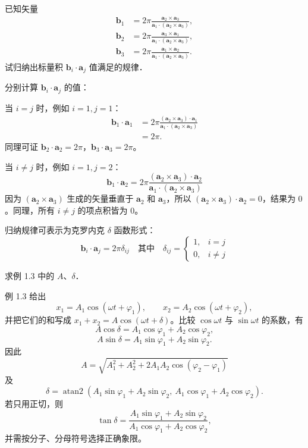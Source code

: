 \begin{exercise}\label{ex:1.17}
已知矢量
\[
\begin{aligned}
\boldsymbol b_1&=2\pi\frac{\boldsymbol a_2\times\boldsymbol a_3}{\boldsymbol a_1\cdot(\boldsymbol a_2\times\boldsymbol a_3)},\\
\boldsymbol b_2&=2\pi\frac{\boldsymbol a_3\times\boldsymbol a_1}{\boldsymbol a_1\cdot(\boldsymbol a_2\times\boldsymbol a_3)},\\
\boldsymbol b_3&=2\pi\frac{\boldsymbol a_1\times\boldsymbol a_2}{\boldsymbol a_1\cdot(\boldsymbol a_2\times\boldsymbol a_3)}.
\end{aligned}
\]
试归纳出标量积 $\boldsymbol{b}_i \cdot \boldsymbol{a}_j$ 值满足的规律．
\end{exercise}
\begin{solution}
分别计算 $\boldsymbol{b}_i \cdot \boldsymbol{a}_j$ 的值：

当 $i = j$ 时，例如 $i=1, j=1$：
\[
\begin{aligned}
\boldsymbol b_1\cdot\boldsymbol a_1
 &=2\pi\frac{(\boldsymbol a_2\times\boldsymbol a_3)\cdot\boldsymbol a_1}
 {\boldsymbol a_1\cdot(\boldsymbol a_2\times\boldsymbol a_3)}\\
 &=2\pi.
\end{aligned}
\]
同理可证 $\boldsymbol{b}_2 \cdot \boldsymbol{a}_2 = 2\pi$，$\boldsymbol{b}_3 \cdot \boldsymbol{a}_3 = 2\pi$。

当 $i \neq j$ 时，例如 $i=1, j=2$：
$$ \boldsymbol{b}_1 \cdot \boldsymbol{a}_2 = 2\pi \frac{(\boldsymbol{a}_2 \times \boldsymbol{a}_3) \cdot \boldsymbol{a}_2}{\boldsymbol{a}_1 \cdot (\boldsymbol{a}_2 \times \boldsymbol{a}_3)} $$
因为 $(\boldsymbol{a}_2 \times \boldsymbol{a}_3)$ 生成的矢量垂直于 $\boldsymbol{a}_2$ 和 $\boldsymbol{a}_3$，所以 $(\boldsymbol{a}_2 \times \boldsymbol{a}_3) \cdot \boldsymbol{a}_2 = 0$，结果为 $0$。同理，所有 $i \neq j$ 的项点积皆为 $0$。

归纳规律可表示为克罗内克 $\delta$ 函数形式：
$$ \boldsymbol{b}_i \cdot \boldsymbol{a}_j = 2\pi \delta_{ij} \quad \text{其中} \quad \delta_{ij} = \begin{cases} 1, & i = j \\ 0, & i \neq j \end{cases} $$
\end{solution}

\begin{exercise}\label{ex:1.18}
求例 1.3 中的 $A$、$\delta$．
\end{exercise}
\begin{solution}
例 1.3 给出
$$
x_1=A_1\cos(\omega t+\varphi_1),\qquad x_2=A_2\cos(\omega t+\varphi_2),
$$
并把它们的和写成 $x_1+x_2=A\cos(\omega t+\delta)$。比较 $\cos\omega t$ 与 $\sin\omega t$ 的系数，有
$$
A\cos\delta=A_1\cos\varphi_1+A_2\cos\varphi_2,
$$
$$
A\sin\delta=A_1\sin\varphi_1+A_2\sin\varphi_2.
$$
因此
$$
\boxed{A=\sqrt{A_1^2+A_2^2+2A_1A_2\cos(\varphi_2-\varphi_1)}}
$$
及
$$
\boxed{\delta=\operatorname{atan2}\!\left(A_1\sin\varphi_1+A_2\sin\varphi_2,\ A_1\cos\varphi_1+A_2\cos\varphi_2\right)}.
$$
若只用正切，则
$$
\tan\delta=\frac{A_1\sin\varphi_1+A_2\sin\varphi_2}{A_1\cos\varphi_1+A_2\cos\varphi_2},
$$
并需按分子、分母符号选择正确象限。
\end{solution}

